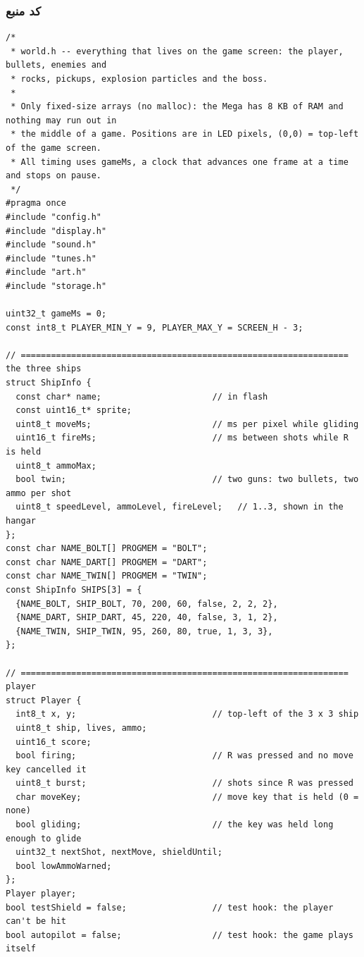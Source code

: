 \documentclass[11pt,a4paper]{article}
\begin{document}
\subsubsection*{کد منبع}
\begin{latin}
\begin{lstlisting}[language=Arduino]
/*
 * world.h -- everything that lives on the game screen: the player, bullets, enemies and
 * rocks, pickups, explosion particles and the boss.
 *
 * Only fixed-size arrays (no malloc): the Mega has 8 KB of RAM and nothing may run out in
 * the middle of a game. Positions are in LED pixels, (0,0) = top-left of the game screen.
 * All timing uses gameMs, a clock that advances one frame at a time and stops on pause.
 */
#pragma once
#include "config.h"
#include "display.h"
#include "sound.h"
#include "tunes.h"
#include "art.h"
#include "storage.h"

uint32_t gameMs = 0;
const int8_t PLAYER_MIN_Y = 9, PLAYER_MAX_Y = SCREEN_H - 3;

// ================================================================= the three ships
struct ShipInfo {
  const char* name;                      // in flash
  const uint16_t* sprite;
  uint8_t moveMs;                        // ms per pixel while gliding
  uint16_t fireMs;                       // ms between shots while R is held
  uint8_t ammoMax;
  bool twin;                             // two guns: two bullets, two ammo per shot
  uint8_t speedLevel, ammoLevel, fireLevel;   // 1..3, shown in the hangar
};
const char NAME_BOLT[] PROGMEM = "BOLT";
const char NAME_DART[] PROGMEM = "DART";
const char NAME_TWIN[] PROGMEM = "TWIN";
const ShipInfo SHIPS[3] = {
  {NAME_BOLT, SHIP_BOLT, 70, 200, 60, false, 2, 2, 2},
  {NAME_DART, SHIP_DART, 45, 220, 40, false, 3, 1, 2},
  {NAME_TWIN, SHIP_TWIN, 95, 260, 80, true, 1, 3, 3},
};

// ================================================================= player
struct Player {
  int8_t x, y;                           // top-left of the 3 x 3 ship
  uint8_t ship, lives, ammo;
  uint16_t score;
  bool firing;                           // R was pressed and no move key cancelled it
  uint8_t burst;                         // shots since R was pressed
  char moveKey;                          // move key that is held (0 = none)
  bool gliding;                          // the key was held long enough to glide
  uint32_t nextShot, nextMove, shieldUntil;
  bool lowAmmoWarned;
};
Player player;
bool testShield = false;                 // test hook: the player can't be hit
bool autopilot = false;                  // test hook: the game plays itself


\end{lstlisting}
\end{latin}
\end{document}
